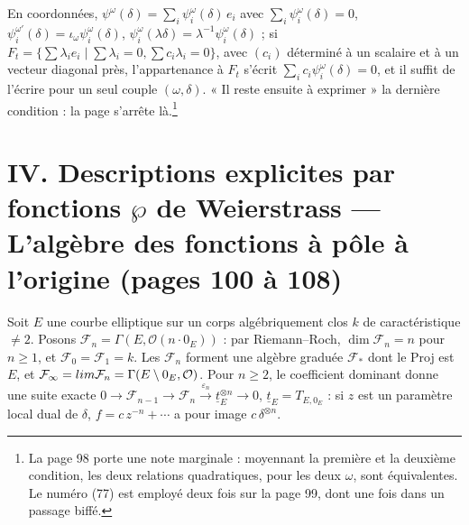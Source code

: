 \documentclass[11pt,a4paper]{article}
\begin{document}
En coordonnées, $\psi^{\omega}(\delta) = \sum_i \psi^{\omega}_i(\delta)\, e_i$
avec $\sum_i \psi^{\omega}_i(\delta) = 0$,
$\psi_i^{\omega'}(\delta) = \iota_\omega \psi_i^{\omega}(\delta)$,
$\psi_i^{\omega}(\lambda\delta) = \lambda^{-1} \psi_i^{\omega}(\delta)$ ; si
$F_t = \{\sum \lambda_i e_i \mid \sum \lambda_i = 0, \sum c_i \lambda_i = 0\}$,
avec $(c_i)$ déterminé à un scalaire et à un vecteur diagonal près,
l'appartenance à $F_t$ s'écrit $\sum_i c_i \psi^{\omega}_i(\delta) = 0$, et il
suffit de l'écrire pour un seul couple $(\omega, \delta)$. « Il reste ensuite à
exprimer » la dernière condition : la page s'arrête là.\footnote{La page 98
porte une note marginale : moyennant la première et la deuxième condition, les
deux relations quadratiques, pour les deux $\omega$, sont équivalentes. Le
numéro (77) est employé deux fois sur la page 99, dont une fois dans un passage
biffé.}

\section*{IV. Descriptions explicites par fonctions $\wp$ de Weierstrass --- L'algèbre des fonctions à pôle à l'origine (pages 100 à 108)}

Soit $E$ une courbe elliptique sur un corps algébriquement clos $k$ de
caractéristique $\neq 2$. Posons $\mathcal{F}_n = \Gamma(E, \mathcal{O}(n \cdot
0_E))$ : par Riemann--Roch, $\dim \mathcal{F}_n = n$ pour $n \geq 1$, et
$\mathcal{F}_0 = \mathcal{F}_1 = k$. Les $\mathcal{F}_n$ forment une algèbre
graduée $\mathcal{F}_{*}$ dont le Proj est $E$, et $\mathcal{F}_\infty =
\varinjlim \mathcal{F}_n = \Gamma(E \setminus 0_E, \mathcal{O})$. Pour $n \geq
2$, le coefficient dominant donne une suite exacte $0 \to \mathcal{F}_{n-1} \to
\mathcal{F}_n \xrightarrow{\varepsilon_n} \underline{t}_E^{\otimes n} \to 0$,
$\underline{t}_E = T_{E, 0_E}$ : si $z$ est un paramètre local dual de $\delta$,
$f = c\, z^{-n} + \cdots$ a pour image $c\, \delta^{\otimes n}$.
\end{document}

